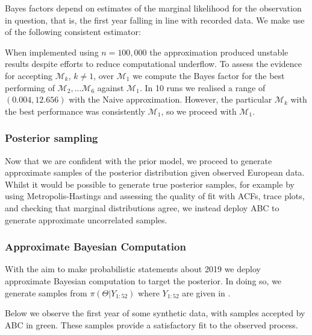 \documentclass[letterpaper,10pt,english]{sphinxmanual}
\let\sphinxpxdimen\pdfpxdimen\else\newdimen\sphinxpxdimen
\begin{document}
Bayes factors depend on estimates of the marginal likelihood for the
observation in question, that is, the first year falling in line with
recorded data. We make use of the following consistent estimator:

\noindent\sphinxincludegraphics[width=400\sphinxpxdimen,height=100\sphinxpxdimen]{{naive}.png}

When implemented using \(n=100,000\) the approximation produced
unstable results despite efforts to reduce computational underflow. To
assess the evidence for accepting \(\mathcal{M}_{k}\),
\(k\neq 1\), over \(\mathcal{M}_{1}\) we compute the Bayes
factor for the best performing of
\(\mathcal{M}_{2},...\mathcal{M}_{6}\) against
\(\mathcal{M}_{1}\). In 10 runs we realised a range of
\((0.004,12.656)\) with the Naive approximation. However, the
particular \(\mathcal{M}_{k}\) with the best performance was
consistently \(\mathcal{M}_{1}\), so we proceed with
\(\mathcal{M}_{1}\).


\subsubsection{Posterior sampling}
\label{\detokenize{models/how_big:posterior-sampling}}
Now that we are confident with the prior model, we proceed to generate approximate
samples of the posterior distribution given observed European data.
Whilst it would be possible to generate true posterior samples, for
example by using Metropolis-Hastings and assessing the quality of fit
with ACFs, trace plots, and checking that marginal distributions agree,
we instead deploy ABC to generate approximate uncorrelated samples.


\subsubsection{Approximate Bayesian Computation}
\label{\detokenize{models/how_big:approximate-bayesian-computation}}
With the aim to make probabilistic statements about 2019 we deploy
approximate Bayesian computation to target the posterior. In doing so,
we generate samples from \(\pi(\Theta|Y_{1:52})\) where
\(Y_{1:52}\) are given in .

Below we observe the first year of some synthetic data, with samples
accepted by ABC in green. These samples provide a satisfactory fit to
the observed process.

\noindent{}
\end{document}
